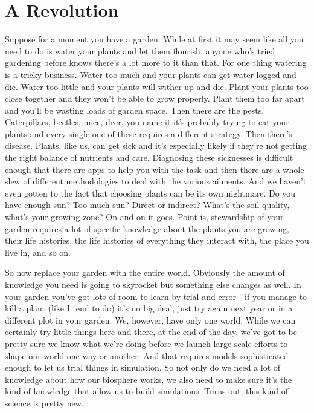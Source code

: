 \documentclass[11pt,a5paper]{book}
\begin{document}
\section{A Revolution}
Suppose for a moment you have a garden. While at first it may seem like all you need to do is water your plants and let them flourish, anyone who's tried gardening before knows there's a lot more to it than that. For one thing watering is a tricky business. Water too much and your plants can get water logged and die. Water too little and your plants will wither up and die. Plant your plants too close together and they won't be able to grow properly. Plant them too far apart and you'll be wasting loads of garden space. Then there are the pests. Caterpillars, beetles, mice, deer, you name it it's probably trying to eat your plants and every single one of these requires a different strategy. Then there's disease. Plants, like us, can get sick and it's especially likely if they're not getting the right balance of nutrients and care. Diagnosing these sicknesses is difficult enough that there are apps to help you with the task and then there are a whole slew of different methodologies to deal with the various ailments. And we haven't even gotten to the fact that choosing plants can be its own nightmare. Do you have enough sun? Too much sun? Direct or indirect? What's the soil quality, what's your growing zone? On and on it goes. Point is, stewardship of your garden requires a lot of specific knowledge about the plants you are growing, their life histories, the life histories of everything they interact with, the place you live in, and so on. 

So now replace your garden with the entire world. Obviously the amount of knowledge you need is going to skyrocket but something else changes as well. In your garden you've got lots of room to learn by trial and error - if you manage to kill a plant (like I tend to do) it's no big deal, just try again next year or in a different plot in your garden. We, however, have only one world. While we can certainly try little things here and there, at the end of the day, we've got to be pretty sure we know what we're doing before we launch large scale efforts to shape our world one way or another. And that requires models sophisticated enough to let us trial things in simulation. So not only do we need a lot of knowledge about how our biosphere works, we also need to make sure it's the kind of knowledge that allow us to build simulations. Turns out, this kind of science is pretty new. 
\newline
\end{document}

